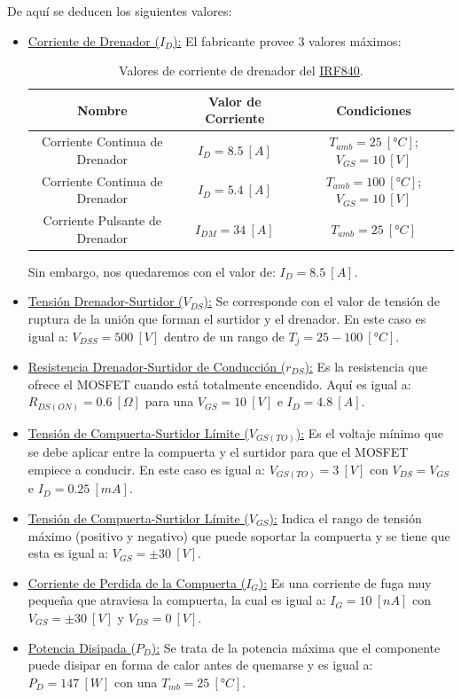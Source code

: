 \documentclass[12pt,a4paper]{article}
\begin{document}
De aquí se deducen los siguientes valores:
\begin{itemize}
    \item \underline{Corriente de Drenador ($I_{D}$):} El fabricante provee 3 valores máximos:
    \begin{table}[H]
        \centering
        \begin{tabular}{|c|c|c|} \hline
            Nombre & Valor de Corriente & Condiciones \\ \hline
            Corriente Continua de Drenador & $I_{D} = 8.5 \ [A]$ & $T_{amb} = 25 \ [°C]$; $V_{GS} = 10 \ [V]$  \\ \hline
            Corriente Continua de Drenador & $I_{D} = 5.4 \ [A]$ & $T_{amb} = 100 \ [°C]$; $V_{GS} = 10 \ [V]$  \\ \hline
            Corriente Pulsante de Drenador & $I_{DM} = 34 \ [A]$ & $T_{amb} = 25 \ [°C]$  \\ \hline
        \end{tabular}
        \caption{Valores de corriente de drenador del \href{https://www.alldatasheet.com/datasheet-pdf/view/17804/PHILIPS/IRF840.html}{IRF840}.}
        \label{tab:tab_1}
    \end{table}
    Sin embargo, nos quedaremos con el valor de: $I_{D} = 8.5 \ [A]$.

    \item \underline{Tensión Drenador-Surtidor ($V_{DS}$):} Se corresponde con el valor de tensión de ruptura de la unión que forman el surtidor y el drenador. En este caso es igual a: $V_{DSS} = 500 \ [V]$ dentro de un rango de $T_{j} = 25-100 \ [°C]$.

    \item \underline{Resistencia Drenador-Surtidor de Conducción ($r_{DS}$):} Es la resistencia que ofrece el MOSFET cuando está totalmente encendido. Aquí es igual a: $R_{DS(ON)} = 0.6 \ [\Omega]$ para una $V_{GS} = 10 \ [V]$ e $I_{D} = 4.8 \ [A]$.

    \item \underline{Tensión de Compuerta-Surtidor Límite ($V_{GS(TO)}$):} Es el voltaje mínimo que se debe aplicar entre la compuerta y el surtidor para que el MOSFET empiece a conducir. En este caso es igual a: $V_{GS(TO)} = 3 \ [V]$ con $V_{DS} = V_{GS}$ e $I_{D} = 0.25 \ [mA]$.

     \item \underline{Tensión de Compuerta-Surtidor Límite ($V_{GS}$):} Indica el rango de tensión máximo (positivo y negativo) que puede soportar la compuerta y se tiene que esta es igual a: $V_{GS} = \pm 30 \ [V]$.

     \item \underline{Corriente de Perdida de la Compuerta ($I_{G}$):} Es una corriente de fuga muy pequeña que atraviesa la compuerta, la cual es igual a: $I_{G} = 10 \ [nA]$ con $V_{GS} = \pm 30 \ [V]$ y $V_{DS} = 0 \ [V]$.

     \item \underline{Potencia Disipada ($P_{D}$):} Se trata de la potencia máxima que el componente puede disipar en forma de calor antes de quemarse y es igual a: $P_{D} = 147 \ [W]$ con una $T_{mb} = 25 \ [°C]$.
\end{itemize}
\end{document}

